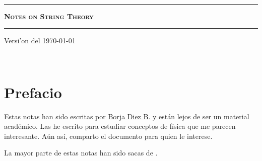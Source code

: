 \documentclass[letterpaper,11pt]{report}
\begin{document}
\sffamily

\thispagestyle{empty}
\begin{center}

\

\vspace{6.5cm}

\rule{15cm}{0.1cm}

\vspace{1.5cm}

{\huge \textsc{\textbf{Notes on String Theory}}}

\vspace{1.5cm}

\rule{15cm}{0.1cm}

\vspace{1.5cm}

Versi'on del \today

\end{center}


\newpage
\thispagestyle{empty}
\ \\
\newpage
\setcounter{page}{1}

\pagestyle{plain}
\chapter*{Prefacio}
\bigskip
\bigskip
\bigskip
\bigskip
\bigskip
\bigskip
Estas notas han sido escritas por \href{https://github.com/10blackhole/}{ Borja Diez B.} y están lejos de ser un material académico. Las he escrito para estudiar conceptos de física que me parecen interesante. Aún así, comparto el documento para quien le interese. 

La mayor parte de estas notas han sido sacas de \cite{2009fcst.book.....Z}.



\bigskip
\bigskip
\bigskip
\bigskip
\bigskip
\bigskip





\bigskip
\bigskip
\bigskip

\bigskip
\bigskip
\bigskip


\tableofcontents
{}
\setcounter{page}{1}


\newpage
\printbibliography
\end{document}
